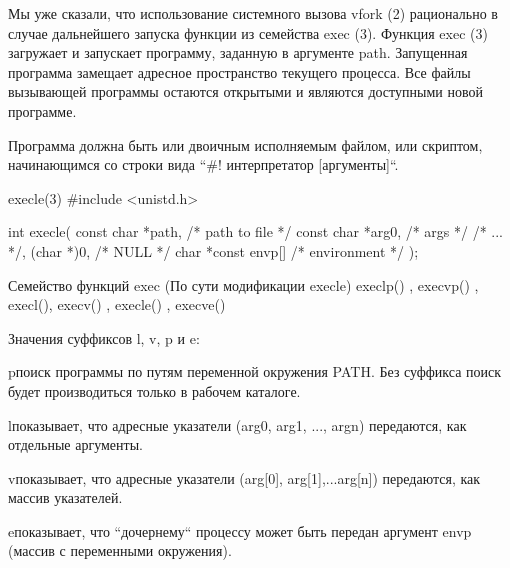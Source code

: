 Мы уже сказали, что использование системного вызова vfork (2) рационально в случае дальнейшего запуска функции из семейства exec (3). Функция exec (3) загружает и запускает программу, заданную в аргументе path. Запущенная программа замещает адресное пространство текущего процесса. Все файлы вызывающей программы остаются открытыми и являются доступными новой программе.

Программа должна быть или двоичным исполняемым файлом, или скриптом, начинающимся со строки вида “#! интерпретатор [аргументы]“. 

\begin{CCode}{execle(3)}
	#include <unistd.h>

	int execle( 
		const char *path, 	/* path to file */ 
		const char *arg0, 	/* args */ /* ... */, 
		(char *)0,			/* NULL */ 
		char *const envp[] 	/* environment */ 
	); \end{CCode}

Семейство функций exec (По сути модификации execle)
	execlp() , execvp() , execl(), execv() , execle() , execve() 
		
Значения суффиксов l, v, p и e:

\begin{myenv}{p}{поиск программы по путям переменной окружения PATH. Без суффикса поиск будет производиться только в рабочем каталоге.}
\end{myenv}

\begin{myenv}{l}{показывает, что адресные указатели (arg0, arg1, ..., argn) передаются, как отдельные аргументы.}
\end{myenv}

\begin{myenv}{v}{показывает,  что  адресные  указатели  (arg[0], arg[1],...arg[n]) передаются, как массив указателей.}
\end{myenv}

\begin{myenv}{e}{показывает, что “дочернему“ процессу может быть передан  аргумент   envp (массив с переменными окружения).}
\end{myenv}

